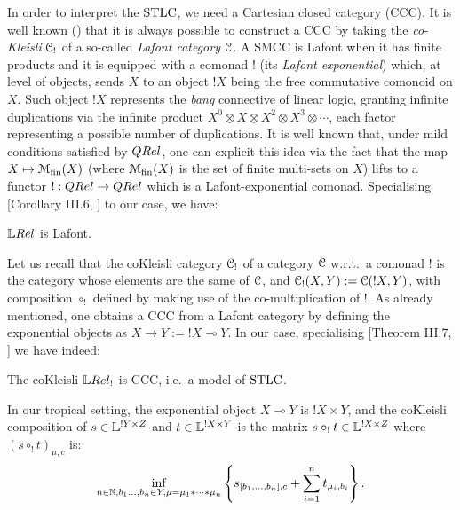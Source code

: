 
In order to interpret the $\mathrm{STLC}$, we need a Cartesian closed category (CCC).
It is well known (\cite{MacLane}) that it is always possible to construct a CCC by taking the \emph{co-Kleisli} $\mathcal{C}_!$ of a so-called \emph{Lafont category} $\mathcal{C}$.
A SMCC is Lafont when it has finite products and it is equipped with a comonad $!$ (its \emph{Lafont exponential}) which, at level of objects, sends $X$ to an object $!X$ being the free commutative comonoid on $X$.
Such object $!X$ represents the \emph{bang} connective of linear logic, granting infinite duplications via the infinite product $X^0\otimes X\otimes X^2\otimes X^3\otimes\cdots$, each factor representing a possible number of duplications.
It is well known that, under mild conditions satisfied by $\QREL$, one can explicit this idea via the fact that the map $X\mapsto \mathcal{M}_{\mathrm{fin}}(X)$ (where $\mathcal{M}_{\mathrm{fin}}(X)$ is the set of finite multi-sets on $X$) lifts to a functor $!:\QREL\to\QREL$ which is a Lafont-exponential comonad.
Specialising [Corollary III.6, \cite{Manzo2013}] to our case, we have:

\begin{fact}
 $\LREL$ is Lafont.
\end{fact}

Let us recall that the coKleisli category $\mathcal{C}_!$ of a category $\mathcal{C}$ w.r.t.\ a comonad $!$ is the category whose elements are the same of $\mathcal{C}$, and ${\mathcal{C}_!}(X,Y):={\mathcal{C}}(!X,Y)$, with composition $\circ_!$ defined by making use of the co-multiplication of $!$.
As already mentioned, one obtains a CCC from a Lafont category by defining the exponential objects as $X\to Y:=!X \multimap Y$.
In our case, specialising [Theorem III.7, \cite{Manzo2013}] we have indeed:
\begin{fact}
 The coKleisli $\LREL_!$ is CCC, i.e.\ a model of $\mathrm{STLC}$.
\end{fact}

In our tropical setting, 
the exponential object $X\multimap Y$ is $!X\times Y$, and 
the coKleisli composition of $s\in\mathbb{L}^{!Y\times Z}$ and $t\in\mathbb{L}^{!X\times Y}$ is the matrix $s\circ_! t\in\mathbb{L}^{!X\times Z}$ where $(s\circ_! t)_{\mu,c}$ is:
\begin{align}
 \inf\limits_{n\in\mathbb{N}, b_1\dots,b_n\in Y, \mu = \mu_1*\cdots *\mu_n}
 \left\{s_{[b_1,\dots,b_n],c} + \sum\limits_{i=1}^n t_{\mu_i,b_i}\right\}.
\end{align}

